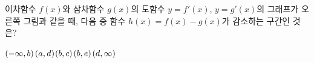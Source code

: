 \noindent\begin{minipage}[t]{0.58\linewidth}\vspace{0pt}\raggedright 이차함수 $f(x)$와 삼차함수 $g(x)$의 도함수 $y=f'(x)$, $y=g'(x)$의 그래프가 오른쪽 그림과 같을 때, 다음 중 함수 $h(x)=f(x)-g(x)$가 감소하는 구간인 것은?\end{minipage}\hfill\begin{minipage}[t]{0.4\linewidth}\vspace{0pt}\centering \resizebox{\ifdim\width>\linewidth\linewidth\else\width\fi}{!}{}\end{minipage}\par
\begin{choices32}{$(-\infty{,}\mkern3mu\mathopen{}b)$}{$(a{,}\mkern3mu\mathopen{}d)$}{$(b{,}\mkern3mu\mathopen{}c)$}{$(b{,}\mkern3mu\mathopen{}e)$}{$(d{,}\mkern3mu\mathopen{}\infty)$}\end{choices32}
